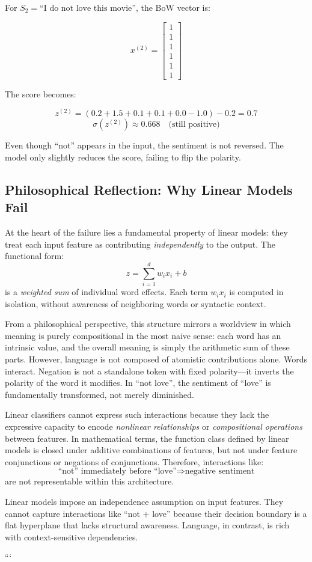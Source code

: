For $S_2 = \text{``I do not love this movie''}$, the BoW vector is:

\[
x^{(2)} = \begin{bmatrix}1 \\ 1 \\ 1 \\ 1 \\ 1 \\ 1\end{bmatrix}
\]

The score becomes:

\[
z^{(2)} = (0.2 + 1.5 + 0.1 + 0.1 + 0.0 - 1.0) - 0.2 = 0.7
\]
\[
\sigma(z^{(2)}) \approx 0.668 \quad \text{(still positive)}
\]

\begin{tcolorbox}[colback=gray!10, colframe=black, title=Observation]
	Even though ``not'' appears in the input, the sentiment is not reversed. The model only slightly reduces the score, failing to flip the polarity.
\end{tcolorbox}

\subsection*{Philosophical Reflection: Why Linear Models Fail}

At the heart of the failure lies a fundamental property of linear models: they treat each input feature as contributing \emph{independently} to the output. The functional form:
\[
z = \sum_{i=1}^{d} w_i x_i + b
\]
is a \textit{weighted sum} of individual word effects. Each term $w_i x_i$ is computed in isolation, without awareness of neighboring words or syntactic context.

From a philosophical perspective, this structure mirrors a worldview in which meaning is purely compositional in the most naive sense: each word has an intrinsic value, and the overall meaning is simply the arithmetic sum of these parts. However, language is not composed of atomistic contributions alone. Words interact. Negation is not a standalone token with fixed polarity—it inverts the polarity of the word it modifies. In ``not love'', the sentiment of ``love'' is fundamentally transformed, not merely diminished.

Linear classifiers cannot express such interactions because they lack the expressive capacity to encode \textit{nonlinear relationships} or \textit{compositional operations} between features. In mathematical terms, the function class defined by linear models is closed under additive combinations of features, but not under feature conjunctions or negations of conjunctions. Therefore, interactions like:
\[
\text{``not'' immediately before ``love''} \Rightarrow \text{negative sentiment}
\]
are not representable within this architecture.

\begin{tcolorbox}[colback=gray!10, colframe=black, title=Key Insight]
	Linear models impose an independence assumption on input features. They cannot capture interactions like ``not + love'' because their decision boundary is a flat hyperplane that lacks structural awareness. Language, in contrast, is rich with context-sensitive dependencies.
\end{tcolorbox}
```

